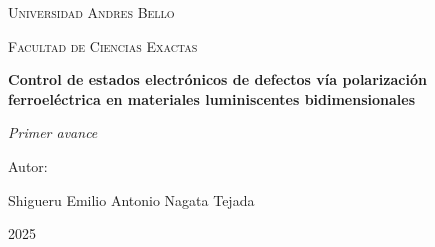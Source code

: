 \begin{titlepage}
    \centering
    {\scshape\LARGE Universidad Andres Bello \par}
    {\scshape\Large Facultad de Ciencias Exactas \par}
    \vspace{1cm}
    {\bfseries\LARGE Control de estados electrónicos de defectos vía polarización ferroeléctrica en materiales luminiscentes bidimensionales \par}
    {\itshape\Large Primer avance \par}
    \vfill
    {\Large Autor: \par}
    {\Large Shigueru Emilio Antonio Nagata Tejada \par}
    \vfill
    {\Large 2025}
\end{titlepage}
